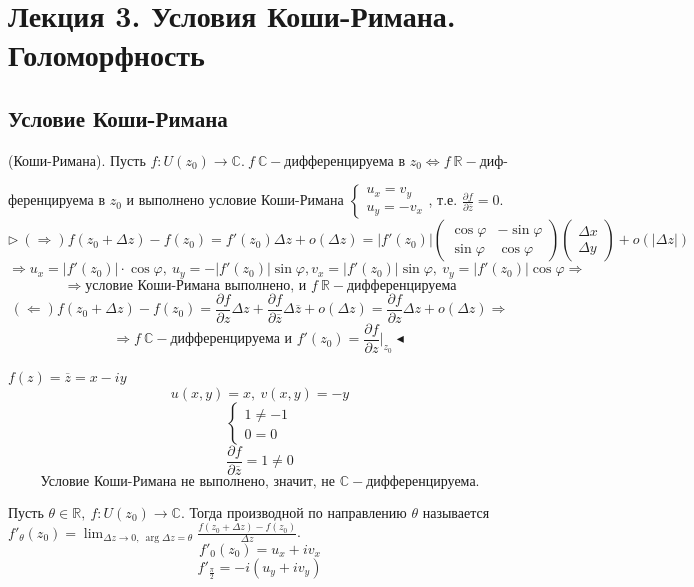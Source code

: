 
\section{Лекция 3. Условия Коши-Римана. Голоморфность}
\subsection{Условие Коши-Римана}

 (Коши-Римана). Пусть $f:U(z_0) \to \mathbb{C}. \ f \ \mathbb{C}-$дифференцируема в $z_0 \Leftrightarrow f \ \mathbb{R}-$диф-

ференцируема в $z_0$ и выполнено условие Коши-Римана $\begin{cases}
    u_x = v_y \\
    u_y = -v_x
\end{cases}$, т.е. $\frac{\partial f}{\partial \overline{z}}=0$.
\[\triangleright \ (\Rightarrow) f(z_0+\Delta z)-f(z_0)=f'(z_0)\Delta z +o(\Delta z) = |f'(z_0)|\left(\begin{array}{ll}
\cos \varphi & -\sin \varphi \\
\sin \varphi & \cos \varphi    
\end{array}\right) \left(\begin{array}{ll}
 \Delta x \\
 \Delta y   
\end{array}\right) + o(|\Delta z|)\]
\[\Rightarrow u_x = |f'(z_0)|\cdot \cos \varphi, \ u_y = -|f'(z_0)|\sin \varphi, v_x = |f'(z_0)|\sin \varphi, \ v_y = |f'(z_0)|\cos \varphi \Rightarrow\] 
\[\Rightarrow \text{условие Коши-Римана выполнено, и $f \ \mathbb{R}-$дифференцируема}\]
\[(\Leftarrow) f(z_0+\Delta z)-f(z_0) = \frac{\partial f}{\partial z} \Delta z + \frac{\partial f}{\partial \overline{z}} \Delta \overline{z}+o(\Delta z) = \frac{\partial f}{\partial z}\Delta z + o(\Delta z) \Rightarrow\]
\[\Rightarrow f \ \mathbb{C}-\text{дифференцируема и } f'(z_0) = \frac{\partial f}{\partial z}\Big|_{z_0} \blacktriangleleft\]

 $f(z) = \overline{z} = x-iy$
\[u(x, y) = x, \ v(x, y) = -y\]
\[\begin{cases}
    1 \neq -1 \\
    0 = 0
\end{cases}\]
\[\frac{\partial f}{\partial \overline{z}} = 1 \neq 0\]
\[\text{Условие Коши-Римана не выполнено, значит, не $\mathbb{C}-$дифференцируема.}\]

 Пусть $\theta \in \mathbb{R}, \ f:U(z_0)\to\mathbb{C}$. Тогда производной по направлению $\theta$ называется $f'_\theta(z_0) = \lim_{\Delta z \to 0, \ \arg \Delta z = \theta} \frac{f(z_0+\Delta z)-f(z_0)}{\Delta z}$.
\[f'_0(z_0) = u_x +iv_x\]
\[f'_{\frac{\pi}{2}} = -i(u_y+iv_y)\]

